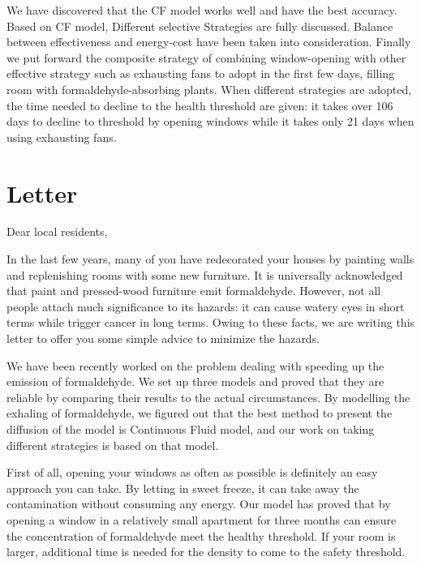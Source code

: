 \documentclass{mcmthesis}
\begin{document}
We have discovered that the CF model works well and have the best accuracy. Based on CF model, Different selective Strategies are fully discussed. Balance between effectiveness and energy-cost have been taken into consideration. Finally we put forward the composite strategy of combining window-opening with other effective strategy such as exhausting fans to adopt in the first few days, filling room with formaldehyde-absorbing plants. When different strategies are adopted, the time needed to decline to the health threshold are given: it takes over 106 days to decline to threshold by opening windows while it takes only 21 days when using exhausting fans.




\newpage
\section*{Letter}



Dear local residents,

In the last few years, many of you have redecorated your houses by painting walls and replenishing rooms with some new furniture. It is universally acknowledged that paint and pressed-wood furniture emit formaldehyde. However, not all people attach much significance to its hazards: it can cause watery eyes in short terms while trigger cancer in long terms. Owing to these facts, we are writing this letter to offer you some simple advice to minimize the hazards.

We have been recently worked on the problem dealing with speeding up the emission of formaldehyde. We set up three models and proved that they are reliable by comparing their results to the actual circumstances. By modelling the exhaling of formaldehyde, we figured out that the best method to present the diffusion of the model is Continuous Fluid model, and our work on taking different strategies is based on that model. 

First of all, opening your windows as often as possible is definitely an easy approach you can take. By letting in sweet freeze, it can take away the contamination without consuming any energy. Our model has proved that by opening a window in a relatively small apartment for three months can ensure the concentration of formaldehyde meet the healthy threshold. If your room is larger, additional time is needed for the density to come to the safety threshold.
\end{document}
